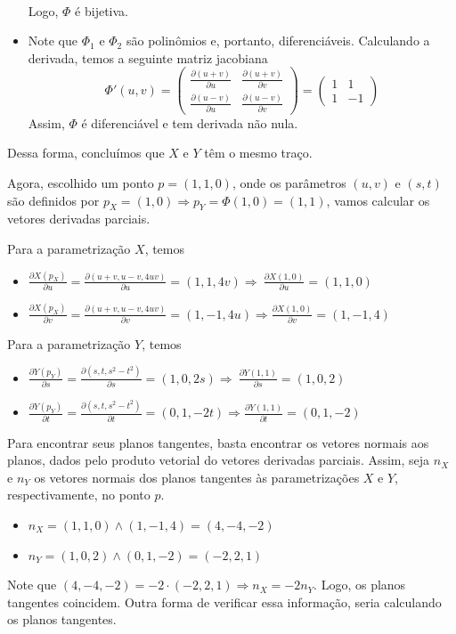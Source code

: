 \documentclass[../main.tex]{subfiles}
\begin{document}
\begin{solucao}
\begin{itemize}
\begin{align*}
				\end{align*}
				Logo, $\Phi$ é bijetiva.
				\item Note que $\Phi_1$ e $\Phi_2$ são polinômios e, portanto, diferenciáveis. Calculando a derivada, temos a seguinte matriz jacobiana
				\[
				\Phi'(u,v)=\begin{pmatrix}\tfrac{\partial (u+v)}{\partial u} & \tfrac{\partial (u+v)}{\partial v}\\ \tfrac{\partial (u-v)}{\partial u} &\tfrac{\partial (u-v)}{\partial v}\end{pmatrix}=\begin{pmatrix}1&1\\1&-1\end{pmatrix}
				\]
				Assim, $\Phi$ é diferenciável e tem derivada não nula.
			\end{itemize}
			Dessa forma, concluímos que $X$ e $Y$ têm o mesmo traço.
			
			Agora, escolhido um ponto $p=(1,1,0)$, onde os parâmetros $(u,v)$ e $(s,t)$ são definidos por $p_X=(1,0)\Rightarrow p_Y=\Phi(1,0)=(1,1)$, vamos calcular os vetores derivadas parciais.
			
			Para a parametrização $X$, temos
			\begin{itemize}
				\item $\frac{\partial X(p_X)}{\partial u}=\frac{\partial (u+v,u-v,4uv)}{\partial u}=(1,1,4v)\Rightarrow\ \frac{\partial X(1,0)}{\partial u}=(1,1,0)$
				\item $\frac{\partial X(p_X)}{\partial v}=\frac{\partial (u+v,u-v,4uv)}{\partial v}=(1,-1,4u)\Rightarrow \frac{\partial X(1,0)}{\partial v}=(1,-1,4)$
			\end{itemize}
			
			Para a parametrização $Y$, temos
			\begin{itemize}
				\item $\frac{\partial Y(p_Y)}{\partial s}=\frac{\partial (s,t,s^2-t^2)}{\partial s}=(1,0,2s)\Rightarrow\ \frac{\partial Y(1,1)}{\partial s}=(1,0,2)$
				\item $\frac{\partial Y(p_Y)}{\partial t}=\frac{\partial (s,t,s^2-t^2)}{\partial t}=(0,1,-2t)\Rightarrow \frac{\partial Y(1,1)}{\partial t}=(0,1,-2)$
			\end{itemize}
			
			Para encontrar seus planos tangentes, basta encontrar os vetores normais aos planos, dados pelo produto vetorial do vetores derivadas parciais. Assim, seja $n_X$ e $n_Y$ os vetores normais dos planos tangentes às parametrizações $X$ e $Y$, respectivamente, no ponto $p$.
			\begin{itemize}
				\item $n_X=(1,1,0)\wedge(1,-1,4)=(4,-4,-2)$
				\item $n_Y=(1,0,2)\wedge(0,1,-2)=(-2,2,1)$
			\end{itemize}
			Note que $(4,-4,-2)=-2\cdot (-2,2,1)\Rightarrow n_X=-2n_Y$. Logo, os planos tangentes coincidem. Outra forma de verificar essa informação, seria calculando os planos tangentes.
			

\end{solucao}
\end{document}
